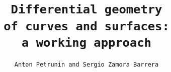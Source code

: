 \title{\tt Differential geometry\\ of curves and surfaces:\\ a working approach}
\author{\tt Anton Petrunin and Sergio Zamora Barrera}
\date{}
\maketitle










\thispagestyle{empty}
\newpage
\tableofcontents
